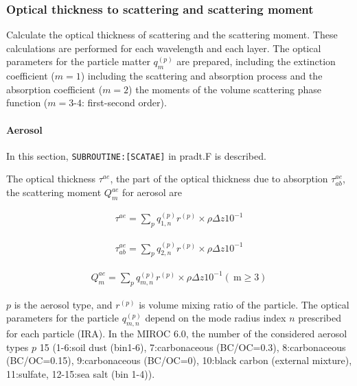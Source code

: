 \hypertarget{optical-thickness-to-scattering-and-scattering-moment}{%
\subsubsection{Optical thickness to scattering and scattering moment}\label{optical-thickness-to-scattering-and-scattering-moment}}

Calculate the optical thickness of scattering and the scattering moment. These calculations are performed for each wavelength and each layer. The optical parameters for the particle matter
\(q_{m}^{(p)}\) are prepared, including the extinction coefficient (\(m = 1\)) including the scattering and absorption process and the absorption coefficient (\(m = 2\)) the moments of the volume
scattering phase function (\(m=3\text{-}4\): first-second order).

\hypertarget{aerosol}{%
\paragraph{Aerosol}\label{aerosol}}

In this section, \texttt{SUBROUTINE:{[}SCATAE{]}} in pradt.F is described.

The optical thickness \(\tau^{a e}\), the part of the optical thickness due to absorption \(\tau_{ab}^{a e}\), the scattering moment \(Q_{m}^{a e}\) for aerosol are

\begin{eqnarray}
\tau^{a e}=\sum_{p} q_{1, n}^{(p)} r^{(p)} \times \rho \Delta z 10^{-1}
\end{eqnarray}

\begin{eqnarray}
\tau_{ab}^{a e}=\sum_{p} q_{2, n}^{(p)} r^{(p)} \times \rho \Delta z 10^{-1}
\end{eqnarray}

\begin{eqnarray}
Q_{m}^{a e}=\sum_{p} q_{m, n}^{(p)} r^{(p)} \times \rho \Delta z 10^{-1} (\mathrm{~m} \geq 3)
\end{eqnarray}

\(p\) is the aerosol type, and \(r^{(p)}\) is volume mixing ratio of the particle. The optical parameters for the particle \(q_{m, n}^{(p)}\) depend on the mode radius index \(n\) prescribed for each
particle (IRA). In the MIROC 6.0, the number of the considered aerosol types \(p\) 15 (1-6:soil dust (bin1-6), 7:carbonaceous (BC/OC=0.3), 8:carbonaceous (BC/OC=0.15), 9:carbonaceous (BC/OC=0),
10:black carbon (external mixture), 11:sulfate, 12-15:sea salt (bin 1-4)).

